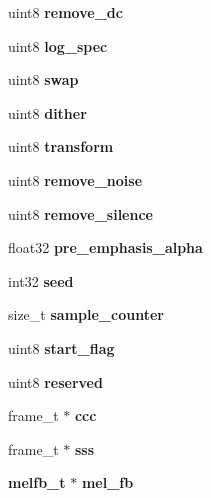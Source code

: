 \begin{DoxyCompactItemize}
\item 
uint8 {\bfseries remove\+\_\+dc}\label{structfe__s_ac575bed8a61105f4302bd27246d4c33d}

\item 
uint8 {\bfseries log\+\_\+spec}\label{structfe__s_a7d3d6513ae6b60632d14c1e1d5dfe891}

\item 
uint8 {\bfseries swap}\label{structfe__s_ab08200d2bfc6d868536d802501525179}

\item 
uint8 {\bfseries dither}\label{structfe__s_abd7b32a70dc6512134e39dd54d160689}

\item 
uint8 {\bfseries transform}\label{structfe__s_a49f2e495d938acaf5c918059e99854e2}

\item 
uint8 {\bfseries remove\+\_\+noise}\label{structfe__s_a254fc94d7868163fba6f2d8826d60fa6}

\item 
uint8 {\bfseries remove\+\_\+silence}\label{structfe__s_a8479b916c411d6d0140bf4a16eb83437}

\item 
float32 {\bfseries pre\+\_\+emphasis\+\_\+alpha}\label{structfe__s_aa7dc496e33955b7f06f83715c05ded8e}

\item 
int32 {\bfseries seed}\label{structfe__s_a0f42573b9f0ce0247181c5dd79e16b67}

\item 
size\+\_\+t {\bfseries sample\+\_\+counter}\label{structfe__s_a40c006f7494fdad56833d5fd7ccf6904}

\item 
uint8 {\bfseries start\+\_\+flag}\label{structfe__s_aa05ae3633c2b33e77a7b8b90e769176b}

\item 
uint8 {\bfseries reserved}\label{structfe__s_a18670c79bc0cd9848fdf4711c5094542}

\item 
frame\+\_\+t $\ast$ {\bfseries ccc}\label{structfe__s_afc472de43bd747de659dd57bc9a74fae}

\item 
frame\+\_\+t $\ast$ {\bfseries sss}\label{structfe__s_a6525c59397073d363e1844c28746fcb9}

\item 
{\bf melfb\+\_\+t} $\ast$ {\bfseries mel\+\_\+fb}\label{structfe__s_ae5a054dbac5e32cf028b6d6d4c9391bd}


\end{DoxyCompactItemize}
